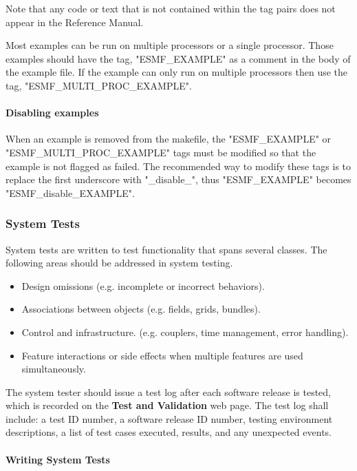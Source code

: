 Note that any code or text that is not contained within the tag pairs does not appear in the
Reference Manual.

\begin{sloppypar}
Most examples can be run on multiple processors or a single processor. Those examples should
have the tag, "ESMF\_EXAMPLE" as a comment in the body of the example file. If the example
can only run on multiple processors then use the tag, "ESMF\_MULTI\_PROC\_EXAMPLE".

\paragraph{Disabling examples}
When an example is removed from the makefile, the "ESMF\_EXAMPLE" or 
"ESMF\_MULTI\_PROC\_EXAMPLE"
tags must be modified so that the example is not flagged as failed. 
The recommended way to modify these tags is to replace the first underscore with "\_disable\_", 
thus "ESMF\_EXAMPLE" becomes
"ESMF\_disable\_EXAMPLE".
\end{sloppypar}

\subsubsection{System Tests}

System tests are written to test functionality that spans several
classes.  The following areas should be addressed in system testing.

\begin{itemize}
\item Design omissions (e.g. incomplete or incorrect behaviors).
\item Associations between objects (e.g. fields, grids, bundles).
\item Control and infrastructure. (e.g. couplers, time management, error handling).
\item Feature interactions or side effects when multiple features are used
simultaneously.
\end{itemize}

The system tester should issue a test log after each software release is tested,
which is recorded on the {\bf Test and Validation} web page. The test
log shall
include: a test ID number, a software release ID number, testing environment
descriptions, a list of test cases executed, results, and any unexpected
events.

\paragraph{Writing System Tests}

